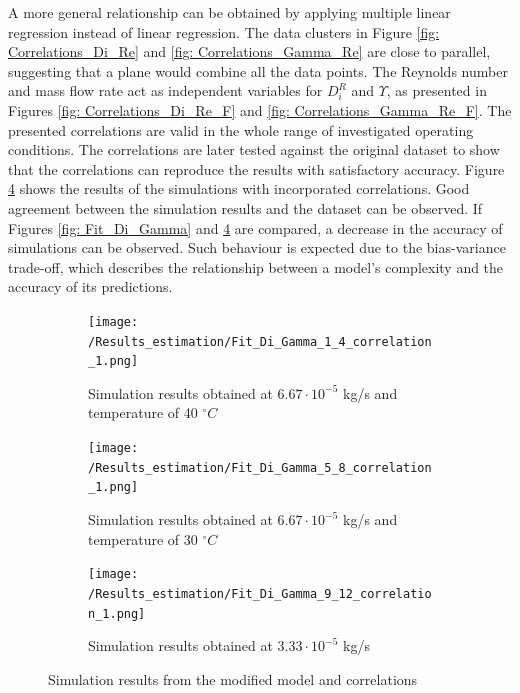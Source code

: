 \documentclass[a4paper,fleqn]{cas-dc}
\begin{document}
A more general relationship can be obtained by applying multiple linear regression instead of linear regression. The data clusters in Figure \ref{fig: Correlations_Di_Re} and \ref{fig: Correlations_Gamma_Re} are close to parallel, suggesting that a plane would combine all the data points. The Reynolds number and mass flow rate act as independent variables for $D_i^R$ and $\Upsilon$, as presented in Figures \ref{fig: Correlations_Di_Re_F} and \ref{fig: Correlations_Gamma_Re_F}. The presented correlations are valid in the whole range of investigated operating conditions. The correlations are later tested against the original dataset to show that the correlations can reproduce the results with satisfactory accuracy. Figure \ref{fig: Fit_Di_Gamma_correlation} shows the results of the simulations with incorporated correlations. Good agreement between the simulation results and the dataset can be observed. If Figures \ref{fig: Fit_Di_Gamma} and \ref{fig: Fit_Di_Gamma_correlation} are compared, a decrease in the accuracy of simulations can be observed. Such behaviour is expected due to the bias-variance trade-off, which describes the relationship between a model's complexity and the accuracy of its predictions.

\begin{figure}[!h]
	\centering
	\begin{subfigure}{0.9\columnwidth}
		\centering
		\texttt{[image: /Results\_estimation/Fit\_Di\_Gamma\_1\_4\_correlation\_1.png]}
		\caption{Simulation results obtained at $6.67\cdot 10^{-5}$ kg/s and temperature of 40 $^\circ C$}
		\label{fig: Fit_1_4_Di_Gamma_correlation}
	\end{subfigure}
	\hfill
	\begin{subfigure}{0.9\columnwidth}
		\centering
		\texttt{[image: /Results\_estimation/Fit\_Di\_Gamma\_5\_8\_correlation\_1.png]}
		\caption{Simulation results obtained at $6.67\cdot 10^{-5}$ kg/s and temperature of 30 $^\circ C$}
		\label{fig: Fit_5_8_Di_Gamma_correlation}
	\end{subfigure}
	\hfill
	\begin{subfigure}{0.9\columnwidth}
		\centering
		\texttt{[image: /Results\_estimation/Fit\_Di\_Gamma\_9\_12\_correlation\_1.png]}
		\caption{Simulation results obtained at $3.33 \cdot 10^{-5}$ kg/s}
		\label{fig: Fit_9_12_Di_Gamma_correlation}
	\end{subfigure}
	\caption{Simulation results from the modified model and correlations}
	\label{fig: Fit_Di_Gamma_correlation}
\end{figure}
\end{document}
